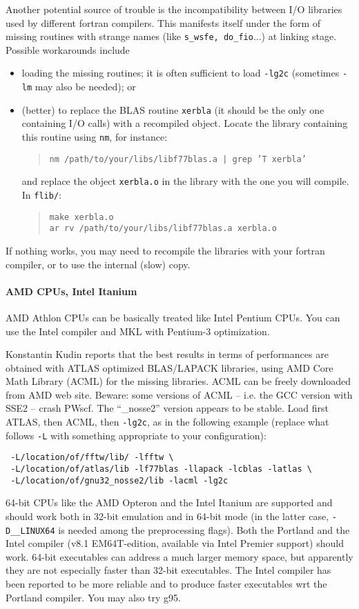 \documentclass[12pt,a4paper]{article}
\begin{document}
Another potential source of trouble is the incompatibility
between I/O libraries used by different fortran compilers.
This manifests itself under the form of missing routines with 
strange names (like \texttt{s\_wsfe, do\_fio}...) at linking stage. 
Possible workarounds include
\begin{itemize}
\item loading the missing routines; it is often sufficient to load
\texttt{-lg2c} (sometimes \texttt{-lm} may also be needed); or
\item (better) to replace the BLAS routine {\tt xerbla} (it should
be the only one containing I/O calls) with a recompiled object. 
Locate the library containing this routine using \texttt{nm}, 
for instance:
\begin{quote}
  {\tt nm /path/to/your/libs/libf77blas.a | grep 'T xerbla'}
\end{quote}
and replace the object  \texttt{xerbla.o} in the library with the 
one you will compile. In \texttt{flib/}:
\begin{quote}
{\tt make xerbla.o} \\
{\tt ar rv /path/to/your/libs/libf77blas.a xerbla.o}
\end{quote}
\end{itemize}
If nothing works, you may need to recompile the libraries with 
your fortran compiler, or to use the internal (slow) copy.

\paragraph{AMD CPUs, Intel Itanium}

AMD Athlon CPUs can be basically treated like Intel Pentium CPUs.
You can use the Intel compiler and MKL with Pentium-3 optimization.

Konstantin Kudin reports that the best results in terms of
performances are obtained with ATLAS optimized BLAS/LAPACK 
libraries, using AMD Core Math Library (ACML) for the missing 
libraries. ACML can be freely downloaded from AMD web site.
Beware: some versions of ACML -- i.e. the GCC version with SSE2 -- 
crash PWscf. The ``\_nosse2'' version appears to be stable. 
Load first ATLAS, then ACML, then \texttt{-lg2c}, as in the 
following example (replace what follows \texttt{-L} with 
something appropriate to your configuration):
\begin{verbatim}
 -L/location/of/fftw/lib/ -lfftw \
 -L/location/of/atlas/lib -lf77blas -llapack -lcblas -latlas \
 -L/location/of/gnu32_nosse2/lib -lacml -lg2c
\end{verbatim}
64-bit CPUs like the AMD Opteron and the Intel Itanium are
supported and should work both in 32-bit emulation and in
64-bit mode (in the latter case, \texttt{-D\_\_LINUX64} is 
needed among the preprocessing flags). Both the Portland and the
Intel compiler (v8.1 EM64T-edition, available via Intel Premier 
support) should work. 64-bit executables can address a 
much larger memory space, but apparently they are not especially
faster than 32-bit executables. The Intel compiler has been 
reported to be more reliable and to produce faster executables 
wrt the Portland compiler. You may also try g95.
\end{document}

